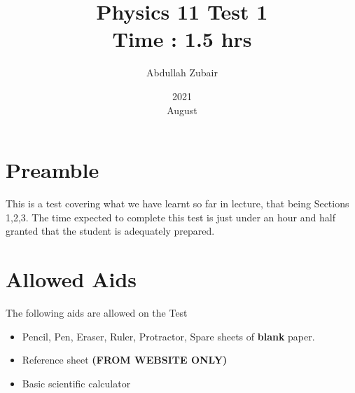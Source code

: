 \documentclass[12pt]{article} %
\title{Physics 11 Test 1 \\ \textbf{Time : 1.5 hrs}}
\date{2021\\ August}
\author{Abdullah Zubair}
\begin{document}
    \renewcommand*{\coursecode}{Test} %
    \renewcommand*{\assgnnumber}{1} %
    \renewcommand*{\submdate}{August 26, 2021} %
    \renewcommand*{\studentfname}{Abdullah} %
    \renewcommand*{\studentlname}{Zubair} %

    \renewcommand\qedsymbol{$\blacksquare$}
    \setfigpath
    \pagestyle{crowdmark}
    \fancyhfoffset[L,O]{0pt} %




	\maketitle
	\section{Preamble}
	This is a test covering what we have learnt so far in lecture, that being Sections 1,2,3. The time expected to complete this test is just under an hour and half granted that the student is adequately prepared.
	\section{Allowed Aids}
	The following aids are allowed on the Test
	\begin{itemize}
		\item Pencil, Pen, Eraser, Ruler, Protractor, Spare sheets of \textbf{blank} paper.
		\item Reference sheet \textbf{(FROM WEBSITE ONLY)}
		\item Basic scientific calculator
	\end{itemize}
\end{document}
